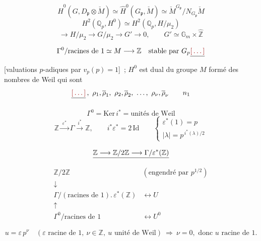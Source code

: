 \documentclass[11pt,a4paper]{article}
\begin{document}
\[
  \widehat{H}^{0}(G, D_{\mathfrak{p}} \otimes \check{M}) \simeq \widehat{H}^{0}(G_{\mathfrak{p}}, \check{M})
  \simeq \check{M}^{G_{\mathfrak{p}}} / N_{G_{\mathfrak{p}}} \check{M}
\]
\[
  H^2(\mathbb{Q}_p, H^{0}) \simeq H^2(\mathbb{Q}_p, H/\mu_2)
\]
\[
  \longrightarrow H/\mu_2 \longrightarrow G/\mu_2 \longrightarrow G' \longrightarrow 0,
  \qquad G' \simeq \mathbb{G}_m \times \widehat{\mathbb{Z}}
\]

\[
  \Gamma^{0}/\text{racines de } 1 \simeq M \longrightarrow \mathbb{Z} \quad
  \text{stable par } G_{p}
  \struck{\ill{}}
\]
[valuations $p$-adiques  par $v_p(p) = 1$]~; $H^{0}$ est dual du groupe $M$ formé
des \struck{\ill{}} nombres de Weil qui sont
\[
  \struck{\ill{}}\,, \ \rho_1, \overline{\rho}_1, \ \rho_2, \overline{\rho}_2, \ \ldots,
  \ \rho_\nu, \overline{\rho}_\nu \qquad n_1
\]

\[
  \Gamma^{0} = \mathrm{Ker}\, i^{*} = \text{unités de Weil}
\]
\[
  \mathbb{Z} \xrightarrow{\;\varepsilon^{*}\;} \Gamma \xrightarrow{\;i^{*}\;} \mathbb{Z},
  \qquad i^{*}\varepsilon^{*} = 2\,\mathrm{Id}
  \qquad
  \begin{cases}
    \varepsilon^{*}(1) = p \\
    |\lambda| = p^{\,i^{*}(\lambda)/2}
  \end{cases}
\]

\[
  \struck{\mathbb{Z} \longrightarrow \mathbb{Z}/2\mathbb{Z} \longrightarrow \Gamma/\varepsilon^{*}(\mathbb{Z})}
\]
\[
  \begin{array}{ll}
    \mathbb{Z}/2\mathbb{Z} & (\text{engendré par } p^{1/2}) \\
    \downarrow & \\
    \Gamma/(\text{racines de } 1).\,\varepsilon^{*}(\mathbb{Z}) & \longleftrightarrow U \\
    \uparrow & \\
    \Gamma^{0}/\text{racines de } 1 & \longleftrightarrow U^{0}
  \end{array}
\]

\[
  u = \varepsilon\, p^{\nu} \quad
  (\varepsilon \text{ racine de } 1,\ \nu \in \mathbb{Z},\ u \text{ unité de Weil})
  \ \Longrightarrow\ \nu = 0, \text{ donc } u \text{ racine de } 1.
\]
\end{document}
